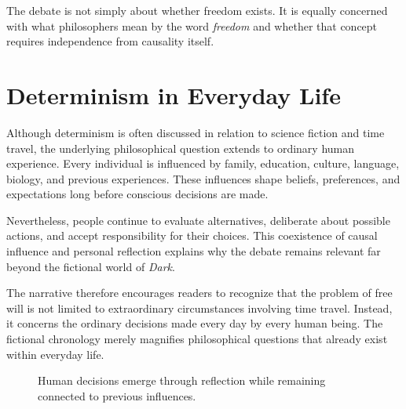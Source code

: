 \documentclass[12pt,oneside,openany]{book}
\begin{document}
\begin{tcolorbox}[colback=yellow!8,colframe=orange!70!black,title=Philosophical Insight]
The debate is not simply about whether freedom exists. It is equally concerned
with what philosophers mean by the word \emph{freedom} and whether that concept
requires independence from causality itself.
\end{tcolorbox}

\section{Determinism in Everyday Life}

Although determinism is often discussed in relation to science fiction and time
travel, the underlying philosophical question extends to ordinary human
experience. Every individual is influenced by family, education, culture,
language, biology, and previous experiences. These influences shape beliefs,
preferences, and expectations long before conscious decisions are made.

Nevertheless, people continue to evaluate alternatives, deliberate about
possible actions, and accept responsibility for their choices. This coexistence
of causal influence and personal reflection explains why the debate remains
relevant far beyond the fictional world of \textit{Dark}.

The narrative therefore encourages readers to recognize that the problem of
free will is not limited to extraordinary circumstances involving time travel.
Instead, it concerns the ordinary decisions made every day by every human
being. The fictional chronology merely magnifies philosophical questions that
already exist within everyday life.
\begin{figure}[H]
\centering
{}

\caption{Human decisions emerge through reflection while remaining connected to previous influences.}
\end{figure}
\end{document}
